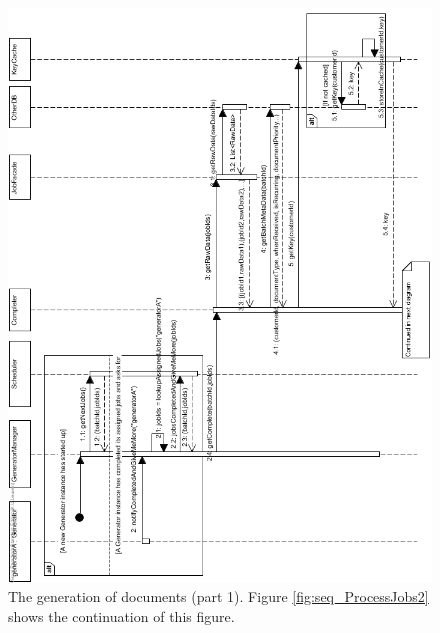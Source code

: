 \documentclass[a4paper,10pt]{article}
\begin{document}
\begin{figure}[!htp]
    \centering
    \includegraphics[width=\textwidth]{ProcessJobs1.png}
    \caption{The generation of documents (part 1). Figure \ref{fig:seq_ProcessJobs2} shows the continuation of this figure.
        }\label{fig:seq_ProcessJobs1}
\end{figure}
\end{document}
